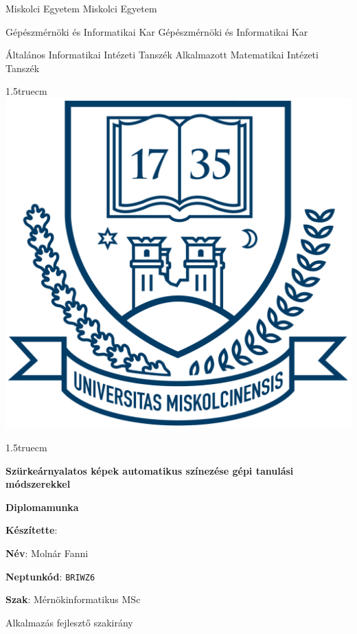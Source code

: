 \pagestyle{empty}

{\small
Miskolci Egyetem \hfill Miskolci Egyetem

Gépészmérnöki és Informatikai Kar \hfill Gépészmérnöki és Informatikai Kar

Általános Informatikai Intézeti Tanszék \hfill \hfill Alkalmazott Matematikai Intézeti Tanszék}

{\large
\begin{center}
\vglue 1.5truecm
\includegraphics[scale=0.15]{images/me_logo.png}\\
\end{center}}

\vglue 1.5truecm

{\huge
\begin{center}
\textbf{Szürkeárnyalatos képek automatikus színezése gépi tanulási módszerekkel}
\end{center}}

\vspace*{1cm}

\begin{center}
\LARGE \textbf{Diplomamunka}
\end{center}

\vspace*{2.5truecm}

{\large
\hspace{6.5cm} \textbf{Készítette}:


\hspace{6.5cm} \textbf{Név}: Molnár Fanni


\hspace{6.5cm} \textbf{Neptunkód}: \texttt{BRIWZ6}


\hspace{6.5cm} \textbf{Szak}: Mérnökinformatikus MSc


\hspace{6.5cm} Alkalmazás fejlesztő szakirány
}

\newpage
